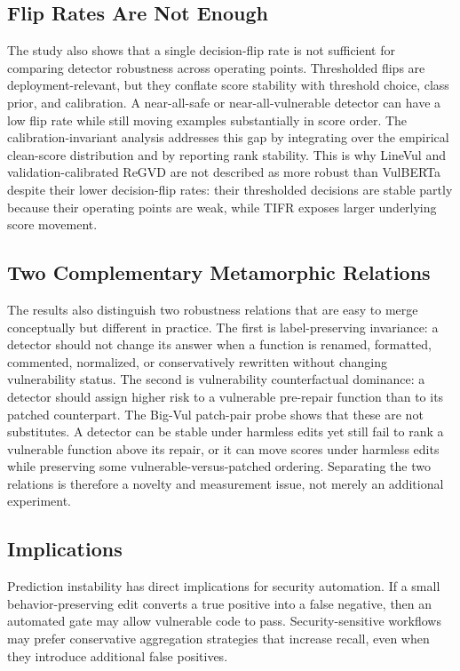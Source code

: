 \documentclass[a4paper,fleqn]{cas-dc}
\begin{document}
\subsection{Flip Rates Are Not Enough}

The study also shows that a single decision-flip rate is not sufficient for
comparing detector robustness across operating points. Thresholded flips are
deployment-relevant, but they conflate score stability with threshold choice,
class prior, and calibration. A near-all-safe or near-all-vulnerable detector
can have a low flip rate while still moving examples substantially in score
order. The calibration-invariant analysis addresses this gap by integrating
over the empirical clean-score distribution and by reporting rank stability.
This is why LineVul and validation-calibrated ReGVD are not described as more
robust than VulBERTa despite their lower decision-flip rates: their
thresholded decisions are stable partly because their operating points are
weak, while TIFR exposes larger underlying score movement.

\subsection{Two Complementary Metamorphic Relations}

The results also distinguish two robustness relations that are easy to merge
conceptually but different in practice. The first is label-preserving
invariance: a detector should not change its answer when a function is renamed,
formatted, commented, normalized, or conservatively rewritten without changing
vulnerability status. The second is vulnerability counterfactual dominance: a
detector should assign higher risk to a vulnerable pre-repair function than to its
patched counterpart. The Big-Vul patch-pair probe shows that these are not
substitutes. A detector can be stable under harmless edits yet still fail to
rank a vulnerable function above its repair, or it can move scores under
harmless edits while preserving some vulnerable-versus-patched ordering.
Separating the two relations is therefore a novelty and measurement issue, not
merely an additional experiment.

\subsection{Implications}

Prediction instability has direct implications for security automation. If a
small behavior-preserving edit converts a true positive into a false negative,
then an automated gate may allow vulnerable code to pass. Security-sensitive
workflows may prefer conservative aggregation strategies that increase recall,
even when they introduce additional false positives.
\end{document}
